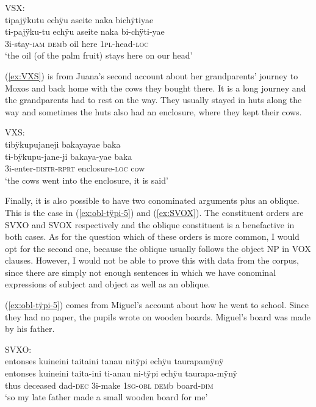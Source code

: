 \ea\label{ex:VSX}
\begingl
\glpreamble \textup{VSX:}\\tipajÿkutu echÿu aseite naka bichÿtiyae\\
\gla ti-pajÿku-tu echÿu aseite naka bi-chÿti-yae\\
\glb 3i-stay-\textsc{iam} \textsc{dem}b oil here 1\textsc{pl}-head-\textsc{loc}\\
\glft ‘the oil (of the palm fruit) stays here on our head’
\endgl
\trailingcitation{[jxx-d181102l.30]}
\xe


(\ref{ex:VXS}) is from Juana’s second account about her grandparents’ journey to Moxos and back home with the cows they bought there. It is a long journey and the grandparents had to rest on the way. They usually stayed in huts along the way and sometimes the huts also had an enclosure, where they kept their cows.

\ea\label{ex:VXS}
\begingl
\glpreamble \textup{VXS:}\\tibÿkupujaneji bakayayae baka\\
\gla ti-bÿkupu-jane-ji bakaya-yae baka\\
\glb 3i-enter-\textsc{distr}-\textsc{rprt} enclosure-\textsc{loc} cow\\
\glft ‘the cows went into the enclosure, it is said’
\endgl
\trailingcitation{[jxx-p151016l-2.166]}
\xe


Finally, it is also possible to have two conominated arguments plus an oblique. This is the case in (\ref{ex:obl-tÿpi-5}) and (\ref{ex:SVOX}). The constituent orders are SVXO and SVOX respectively and the oblique constituent is a benefactive in both cases. As for the question which of these orders is more common, I would opt for the second one, because the oblique usually follows the object NP in VOX clauses. However, I would not be able to prove this with data from the corpus, since there are simply not enough sentences in which we have conominal expressions of subject and object as well as an oblique.

(\ref{ex:obl-tÿpi-5}) comes from Miguel’s account about how he went to school. Since they had no paper, the pupils wrote on wooden boards. Miguel’s board was made by his father.


\ea\label{ex:obl-tÿpi-5}
\begingl
\glpreamble \textup{SVXO:}\\entonses kuineini taitaini tanau nitÿpi echÿu taurapamÿnÿ\\
\gla entonses kuineini taita-ini ti-anau ni-tÿpi echÿu taurapa-mÿnÿ\\
\glb thus deceased dad-\textsc{dec} 3i-make 1\textsc{sg}-\textsc{obl} \textsc{dem}b board-\textsc{dim}\\
\glft ‘so my late father made a small wooden board for me’
\endgl
\trailingcitation{[mxx-p181027l-1.023]}
\xe


